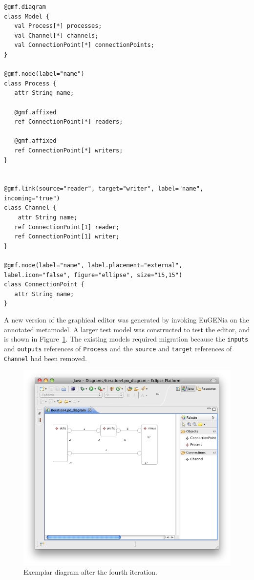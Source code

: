 \begin{lstlisting}[caption=The annotated process-oriented metamodel after the fourth iteration, label=lst:po_it4_mm, language=Emfatic]
@gmf.diagram
class Model {
   val Process[*] processes;
   val Channel[*] channels;
   val ConnectionPoint[*] connectionPoints;
}

@gmf.node(label="name")
class Process {
   attr String name;
      
   @gmf.affixed
   ref ConnectionPoint[*] readers;
   
   @gmf.affixed
   ref ConnectionPoint[*] writers; 
}


@gmf.link(source="reader", target="writer", label="name", incoming="true")
class Channel { 
	attr String name;
   ref ConnectionPoint[1] reader;
   ref ConnectionPoint[1] writer;
}

@gmf.node(label="name", label.placement="external", label.icon="false", figure="ellipse", size="15,15")
class ConnectionPoint {
   attr String name;
}
\end{lstlisting}

A new version of the graphical editor was generated by invoking EuGENia on the annotated metamodel. A larger test model was constructed to test the editor, and is shown in Figure~\ref{fig:po_it4_model}. The existing models required migration because the \texttt{in\-pu\-ts} and \texttt{ou\-tp\-u\-ts} references of \texttt{Pr\-oc\-e\-ss} and the \texttt{s\-ou\-r\-ce} and \texttt{ta\-rg\-et} references of \texttt{Channel} had been removed.

\begin{figure}[htbp]
	\centering
		\includegraphics[scale=0.5]{A.2.ProcessOriented/images/4_model.png}
	\caption{Exemplar diagram after the fourth iteration.}
	\label{fig:po_it4_model}
\end{figure}

